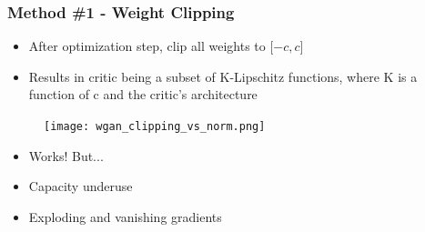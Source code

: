 \documentclass{Bredelebeamer}
\begin{document}
\begin{frame}
	\frametitle{Method \#1 - Weight Clipping}
	\begin{itemize}[<+->]
		\item After optimization step, clip all weights to $ \big[{-c}, c \big] $
		\item Results in critic being a subset of K-Lipschitz functions, where K is a function of c and the critic's architecture
	\end{itemize}
	\pause
	\begin{figure}[h!]
		\centering
		\texttt{[image: wgan\_clipping\_vs\_norm.png]}
	\end{figure}
	\begin{itemize}[<+->]
		\item Works! But...
		\item Capacity underuse
		\item Exploding and vanishing gradients
	\end{itemize}
\end{frame}
\end{document}
